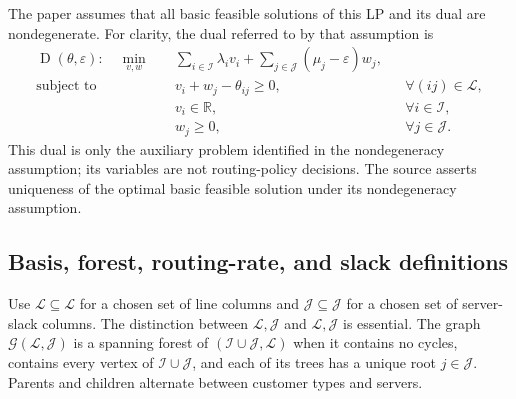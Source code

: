 \documentclass{article}
\begin{document}
The paper assumes that all basic feasible solutions of this LP and its dual are nondegenerate. For clarity, the dual referred to by that assumption is
\begin{align}
\operatorname D(\theta,\varepsilon):\quad
\min_{v,w}\quad&\sum_{i\in\mathcal I}\lambda_i v_i+
\sum_{j\in\mathcal J}(\mu_j-\varepsilon)w_j,\tag{16a}\\
\text{subject to}\quad&v_i+w_j-\theta_{ij}\geq0,
&&\forall(ij)\in\mathcal L,\tag{16b}\\
&v_i\in\mathbb R,&&\forall i\in\mathcal I,\tag{16c}\\
&w_j\geq0,&&\forall j\in\mathcal J.\tag{16d}
\end{align}
This dual is only the auxiliary problem identified in the nondegeneracy assumption; its variables are not routing-policy decisions. The source asserts uniqueness of the optimal basic feasible solution under its nondegeneracy assumption.

\subsection*{Basis, forest, routing-rate, and slack definitions}

Use $\mathscr L\subseteq\mathcal L$ for a chosen set of line columns and $\mathscr J\subseteq\mathcal J$ for a chosen set of server-slack columns. The distinction between $\mathscr L,\mathscr J$ and $\mathcal L,\mathcal J$ is essential. The graph $\mathcal G(\mathscr L,\mathscr J)$ is a spanning forest of $(\mathcal I\cup\mathcal J,\mathcal L)$ when it contains no cycles, contains every vertex of $\mathcal I\cup\mathcal J$, and each of its trees has a unique root $j\in\mathscr J$. Parents and children alternate between customer types and servers.
\end{document}
